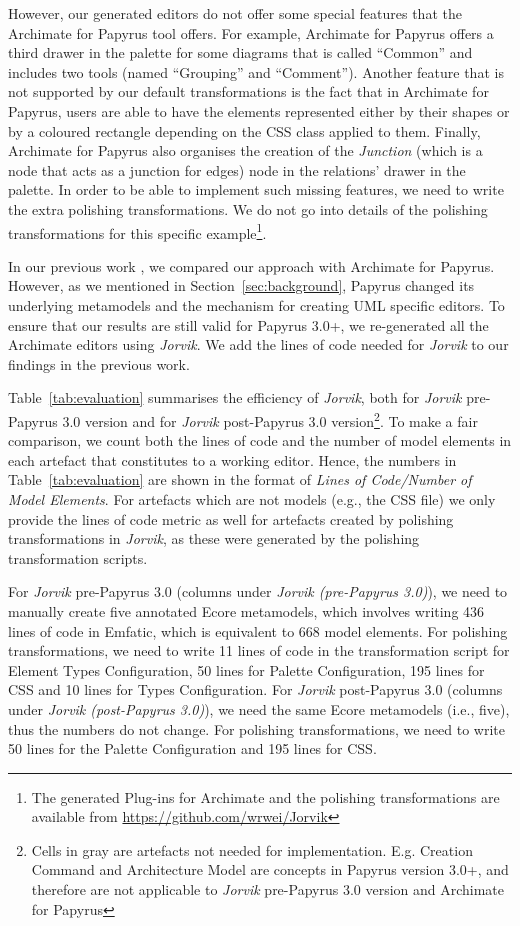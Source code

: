 However, our generated editors do not offer some special features that the Archimate for Papyrus tool offers. 
For example, Archimate for Papyrus offers a third drawer in the palette for some diagrams that is called ``Common'' and includes two tools (named ``Grouping'' and ``Comment''). 
Another feature that is not supported by our default transformations is the fact that in Archimate for Papyrus, users are able to have the elements represented either by their shapes or by a coloured rectangle depending on the CSS class applied to them. 
Finally, Archimate for Papyrus also organises the creation of the \textit{Junction} (which is a node that acts as a junction for edges) node in the relations' drawer in the palette.
In order to be able to implement such missing features, we need to write the extra polishing transformations. 
We do not go into details of the polishing transformations for this specific example\footnote{The generated Plug-ins for Archimate and the polishing transformations are available from \url{https://github.com/wrwei/Jorvik}}.

In our previous work \cite{zolotas2018towards}, we compared our approach with Archimate for Papyrus. 
However, as we mentioned in Section~\ref{sec:background}, Papyrus changed its underlying metamodels and the mechanism for creating UML specific editors. 
To ensure that our results are still valid for Papyrus 3.0+, we re-generated all the Archimate editors using \textit{Jorvik}. 
We add the lines of code needed for \textit{Jorvik} to our findings in the previous work.

Table~\ref{tab:evaluation} summarises the efficiency of \textit{Jorvik}, both for \textit{Jorvik} pre-Papyrus 3.0 version and for \textit{Jorvik} post-Papyrus 3.0 version\footnote{Cells in gray are artefacts not needed for implementation. E.g. Creation Command and Architecture Model are concepts in Papyrus version 3.0+, and therefore are not applicable to \textit{Jorvik} pre-Papyrus 3.0 version and Archimate for Papyrus}. 
To make a fair comparison, we count both the lines of code and the number of model elements in each artefact that constitutes to a working editor. 
Hence, the numbers in Table~\ref{tab:evaluation} are shown in the format of \textit{Lines of Code/Number of Model Elements}.
For artefacts which are not models (e.g., the CSS file) we only provide the lines of code metric as well for artefacts created by polishing transformations in \textit{Jorvik}, as these were generated by the polishing transformation scripts.

For \textit{Jorvik} pre-Papyrus 3.0 (columns under \textit{Jorvik (pre-Papyrus 3.0)}), we need to manually create five annotated Ecore metamodels, which involves writing 436 lines of code in Emfatic, which is equivalent to 668 model elements. 
For polishing transformations, we need to write 11 lines of code in the transformation script for Element Types Configuration, 50 lines for Palette Configuration, 195 lines for CSS and 10 lines for Types Configuration.
For \textit{Jorvik} post-Papyrus 3.0 (columns under \textit{Jorvik (post-Papyrus 3.0)}), we need the same Ecore metamodels (i.e., five), thus the numbers do not change. 
For polishing transformations, we need to write 50 lines for the Palette Configuration and 195 lines for CSS. 

